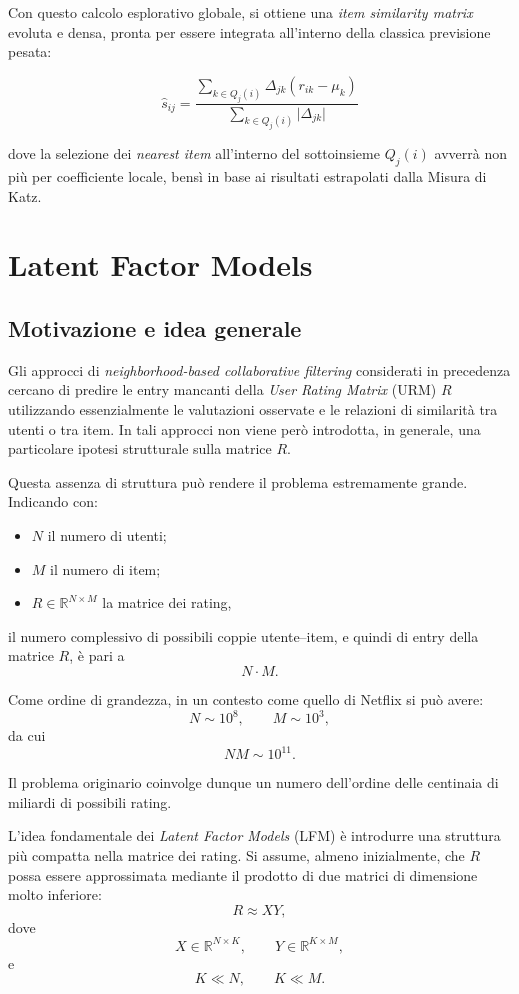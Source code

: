 Con questo calcolo esplorativo globale, si ottiene una \textit{item similarity matrix} evoluta e densa, pronta per essere integrata all'interno della classica previsione pesata:


$$\hat{s}_{ij} = \frac{\sum_{k \in Q_j(i)} \Delta_{jk}(r_{ik} - \mu_k)}{\sum_{k \in Q_j(i)} \vert{}\Delta_{jk}\vert{}}$$


dove la selezione dei \textit{nearest item} all'interno del sottoinsieme $Q_j(i)$ avverrà non più per coefficiente locale, bensì in base ai risultati estrapolati dalla Misura di Katz.



\section{Latent Factor Models}

\subsection{Motivazione e idea generale}

Gli approcci di \emph{neighborhood-based collaborative filtering} considerati in precedenza cercano di predire le entry mancanti della \emph{User Rating Matrix} (URM) $R$ utilizzando essenzialmente le valutazioni osservate e le relazioni di similarità tra utenti o tra item. In tali approcci non viene però introdotta, in generale, una particolare ipotesi strutturale sulla matrice $R$.

Questa assenza di struttura può rendere il problema estremamente grande. Indicando con:
\begin{itemize}
    \item $N$ il numero di utenti;
    \item $M$ il numero di item;
    \item $R \in \mathbb{R}^{N \times M}$ la matrice dei rating,
\end{itemize}
il numero complessivo di possibili coppie utente--item, e quindi di entry della matrice $R$, è pari a
\[
N \cdot M.
\]

Come ordine di grandezza, in un contesto come quello di Netflix si può avere:
\[
N \sim 10^8,
\qquad
M \sim 10^3,
\]
da cui
\[
N M \sim 10^{11}.
\]

Il problema originario coinvolge dunque un numero dell'ordine delle centinaia di miliardi di possibili rating.

L'idea fondamentale dei \emph{Latent Factor Models} (LFM) è introdurre una struttura più compatta nella matrice dei rating. Si assume, almeno inizialmente, che $R$ possa essere approssimata mediante il prodotto di due matrici di dimensione molto inferiore:
\[
R \approx XY,
\]
dove
\[
X \in \mathbb{R}^{N \times K},
\qquad
Y \in \mathbb{R}^{K \times M},
\]
e
\[
K \ll N,
\qquad
K \ll M.
\]

